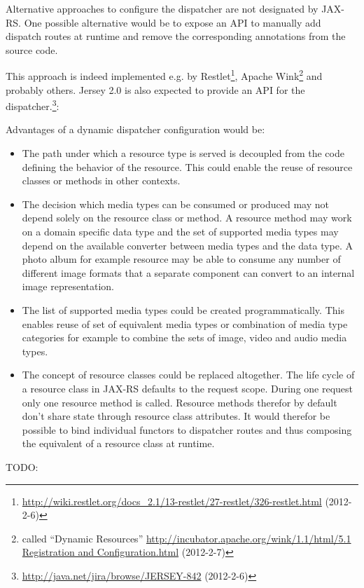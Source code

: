 \documentclass[12pt,a4paper]{scrartcl}		%
\newcommand{\citeurl}[2]{\url{#1} (#2)}
\begin{document}
Alternative approaches to configure the dispatcher are not designated by
JAX-RS. One possible alternative would be to expose an API to manually add
dispatch routes at runtime and remove the corresponding annotations from the
source code. 

This approach is indeed implemented e.g. by
Restlet\footnote{\citeurl{http://wiki.restlet.org/docs_2.1/13-restlet/27-restlet/326-restlet.html}{2012-2-6}},
Apache Wink\footnote{called ``Dynamic Resources''
  \citeurl{http://incubator.apache.org/wink/1.1/html/5.1 Registration and
    Configuration.html}{2012-2-7}} and probably others. Jersey 2.0 is also
expected to provide an API for the
dispatcher.\footnote{\citeurl{http://java.net/jira/browse/JERSEY-842}{2012-2-6}}:

Advantages of a dynamic dispatcher configuration would be:

\begin{itemize}
\item The path under which a resource type is served is decoupled from the code
  defining the behavior of the resource. This could enable the reuse of resource
  classes or methods in other contexts.
\item The decision which media types can be consumed or produced may not depend
  solely on the resource class or method. A resource method may work on a domain
  specific data type and the set of supported media types may depend on the
  available converter between media types and the data type. A photo album for example
  resource may be able to consume any number of different image formats that
  a separate component can convert to an internal image representation.
\item The list of supported media types could be created programmatically. This
  enables reuse of set of equivalent media types or combination of media type
  categories for example to combine the sets of image, video and audio media
  types.
\item The concept of resource classes could be replaced altogether. The life
  cycle of a resource class in JAX-RS defaults to the request scope. During one
  request only one resource method is called. Resource methods therefor by
  default don't share state through resource class attributes. It would therefor
  be possible to bind individual functors to dispatcher routes and thus
  composing the equivalent of a resource class at runtime.
\end{itemize}

TODO:
\end{document}
